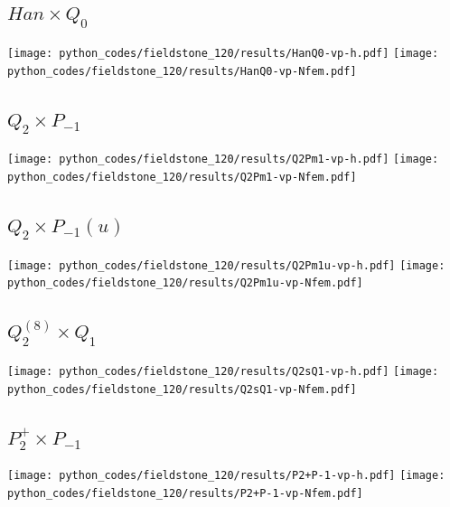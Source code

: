 \subsection*{$Han\times Q_0$}
\begin{center}
\texttt{[image: python\_codes/fieldstone\_120/results/HanQ0-vp-h.pdf]}
\texttt{[image: python\_codes/fieldstone\_120/results/HanQ0-vp-Nfem.pdf]}
\end{center}

\subsection*{$Q_2\times P_{-1}$}
\begin{center}
\texttt{[image: python\_codes/fieldstone\_120/results/Q2Pm1-vp-h.pdf]}
\texttt{[image: python\_codes/fieldstone\_120/results/Q2Pm1-vp-Nfem.pdf]}
\end{center}

\subsection*{$Q_2\times P_{-1}(u)$}
\begin{center}
\texttt{[image: python\_codes/fieldstone\_120/results/Q2Pm1u-vp-h.pdf]}
\texttt{[image: python\_codes/fieldstone\_120/results/Q2Pm1u-vp-Nfem.pdf]}
\end{center}

\subsection*{$Q_2^{(8)}\times Q_1$}
\begin{center}
\texttt{[image: python\_codes/fieldstone\_120/results/Q2sQ1-vp-h.pdf]}
\texttt{[image: python\_codes/fieldstone\_120/results/Q2sQ1-vp-Nfem.pdf]}
\end{center}

\subsection*{$P_2^+\times P_{-1}$}
\begin{center}
\texttt{[image: python\_codes/fieldstone\_120/results/P2+P-1-vp-h.pdf]}
\texttt{[image: python\_codes/fieldstone\_120/results/P2+P-1-vp-Nfem.pdf]}
\end{center}

